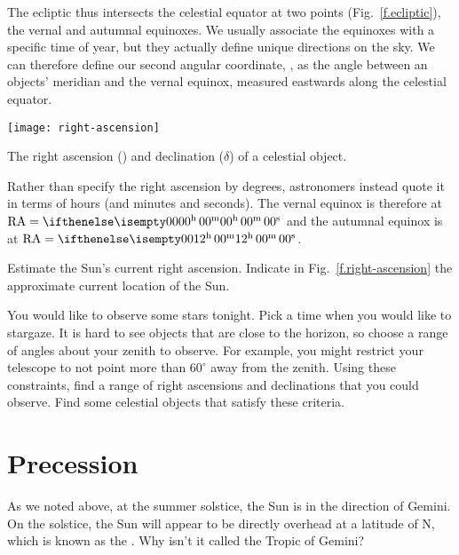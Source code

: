 The ecliptic thus intersects the celestial equator at two points (Fig.~\ref{f.ecliptic}), the vernal and autumnal equinoxes. We usually associate the equinoxes with a specific time of year, but they actually define unique directions on the sky. We can therefore define our second angular coordinate, , as the angle between an objects' meridian and the vernal equinox, measured eastwards along the celestial equator.

\begin{marginfigure}
\texttt{[image: right-ascension]}
\caption[Right ascension and declination]{The right ascension (\RA) and declination ($\delta$) of a celestial object.}
\label{f.right-ascension}
\end{marginfigure}

Rather than specify the right ascension by degrees, astronomers instead quote it in terms of hours (and minutes and seconds).  The vernal equinox is therefore at $\RA = \hrangle{00}{00}{00}$ and the autumnal equinox is at $\RA = \hrangle{12}{00}{00}$.

\begin{exercisebox}
Estimate the Sun's current right ascension. Indicate in Fig.~\ref{f.right-ascension} the approximate current location of the Sun.
\label{ex.RA-sun}
\end{exercisebox}

\begin{exercisebox}
You would like to observe some stars tonight. Pick a time when you would like to stargaze.
It is hard to see objects that are close to the horizon, so choose a range of angles about your zenith to observe.  For example, you might restrict your telescope to not point more than $60^{\circ}$ away from the zenith. Using these constraints, find a range of right ascensions and declinations that you could observe. Find some celestial objects that satisfy these criteria.
\end{exercisebox}

\section{Precession}
As we noted above, at the summer solstice, the Sun is in the direction of Gemini. On the solstice, the Sun will appear to be directly overhead at a latitude of N, which is known as the .  Why isn't it called the Tropic of Gemini?

